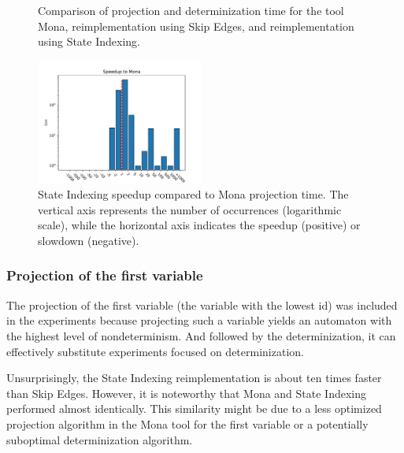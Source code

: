 \documentclass[pdflatex,sn-mathphys-num]{sn-jnl}%
\theoremstyle{thmstyleone}%
\theoremstyle{thmstyletwo}%
\theoremstyle{thmstylethree}%
\begin{document}
\begin{figure}[h!]
\begin{subfigure}{0.49\textwidth}
                \end{subfigure}
                \caption{Comparison of projection and determinization time for the tool Mona, reimplementation using Skip Edges, and reimplementation using State Indexing.}
                \label{figure:projection_last}
            \end{figure}
            \begin{figure}[h!]
                \centering
                \includegraphics[width=0.49\textwidth]{Figures/projection-last-speedup.pdf}
                \caption{State Indexing speedup compared to Mona projection time. The vertical axis represents the number of occurrences (logarithmic scale), while the horizontal axis indicates the speedup (positive) or slowdown (negative).}
                \label{figure:projection_last_speedup}
            \end{figure}
        \subsubsection*{Projection of the first variable}
            The projection of the first variable (the variable with the lowest id) was included in the experiments because projecting such a variable yields an automaton with the highest level of nondeterminism. And followed by the determinization, it can effectively substitute experiments focused on determinization.

            Unsurprisingly, the State Indexing reimplementation is about ten times faster than Skip Edges. However, it is noteworthy that Mona and State Indexing performed almost identically. This similarity might be due to a less optimized projection algorithm in the Mona tool for the first variable or a potentially suboptimal determinization algorithm.

            \newpage
\end{document}
